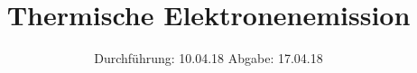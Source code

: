 

\subject{V504}
\title{Thermische Elektronenemission}
\date{%
  Durchführung: 10.04.18
  \hspace{3em}
  Abgabe: 17.04.18
}



\maketitle
\thispagestyle{empty}
\tableofcontents
\newpage






\printbibliography{}


